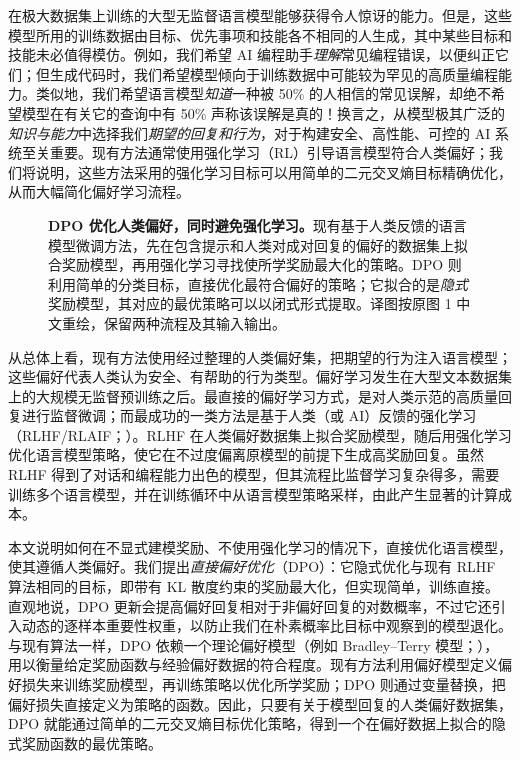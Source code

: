 在极大数据集上训练的大型无监督语言模型能够获得令人惊讶的能力\cite{dpo-chowdhery2022palm,dpo-brown2020language,dpo-touvron2023llama,dpo-bubeck2023sparks}。但是，这些模型所用的训练数据由目标、优先事项和技能各不相同的人生成，其中某些目标和技能未必值得模仿。例如，我们希望 AI 编程助手\emph{理解}常见编程错误，以便纠正它们；但生成代码时，我们希望模型倾向于训练数据中可能较为罕见的高质量编程能力。类似地，我们希望语言模型\emph{知道}一种被 50\% 的人相信的常见误解，却绝不希望模型在有关它的查询中有 50\% 声称该误解是真的！换言之，从模型极其广泛的\emph{知识与能力}中选择我们\emph{期望的回复和行为}，对于构建安全、高性能、可控的 AI 系统至关重要\cite{dpo-ouyang2022training}。现有方法通常使用强化学习（RL）引导语言模型符合人类偏好；我们将说明，这些方法采用的强化学习目标可以用简单的二元交叉熵目标精确优化，从而大幅简化偏好学习流程。


\begin{figure}
    \centering
    
    \caption{\textbf{DPO 优化人类偏好，同时避免强化学习。}现有基于人类反馈的语言模型微调方法，先在包含提示和人类对成对回复的偏好的数据集上拟合奖励模型，再用强化学习寻找使所学奖励最大化的策略。DPO 则利用简单的分类目标，直接优化最符合偏好的策略；它拟合的是\emph{隐式}奖励模型，其对应的最优策略可以以闭式形式提取。译图按原图 1 中文重绘，保留两种流程及其输入输出。}
    \label{dpo-fig:teaser}
\end{figure}

从总体上看，现有方法使用经过整理的人类偏好集，把期望的行为注入语言模型；这些偏好代表人类认为安全、有帮助的行为类型。偏好学习发生在大型文本数据集上的大规模无监督预训练之后。最直接的偏好学习方式，是对人类示范的高质量回复进行监督微调；而最成功的一类方法是基于人类（或 AI）反馈的强化学习（RLHF/RLAIF；\cite{dpo-christiano2017deep,dpo-bai2022constitutional}）。RLHF 在人类偏好数据集上拟合奖励模型，随后用强化学习优化语言模型策略，使它在不过度偏离原模型的前提下生成高奖励回复。虽然 RLHF 得到了对话和编程能力出色的模型，但其流程比监督学习复杂得多，需要训练多个语言模型，并在训练循环中从语言模型策略采样，由此产生显著的计算成本。

本文说明如何在不显式建模奖励、不使用强化学习的情况下，直接优化语言模型，使其遵循人类偏好。我们提出\emph{直接偏好优化}（DPO）：它隐式优化与现有 RLHF 算法相同的目标，即带有 KL 散度约束的奖励最大化，但实现简单，训练直接。直观地说，DPO 更新会提高偏好回复相对于非偏好回复的对数概率，不过它还引入动态的逐样本重要性权重，以防止我们在朴素概率比目标中观察到的模型退化。与现有算法一样，DPO 依赖一个理论偏好模型（例如 Bradley--Terry 模型；\cite{dpo-bradley1952rankanalysis}），用以衡量给定奖励函数与经验偏好数据的符合程度。现有方法利用偏好模型定义偏好损失来训练奖励模型，再训练策略以优化所学奖励；DPO 则通过变量替换，把偏好损失直接定义为策略的函数。因此，只要有关于模型回复的人类偏好数据集，DPO 就能通过简单的二元交叉熵目标优化策略，得到一个在偏好数据上拟合的隐式奖励函数的最优策略。

